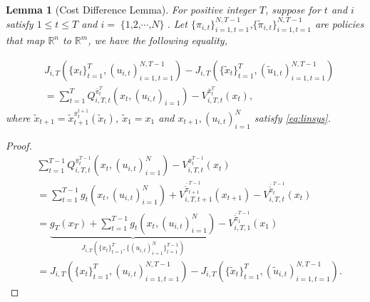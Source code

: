\documentclass[letterpaper, 10 pt, conference]{ieeeconf}  %
\DeclareMathOperator{\Nplayers}{\{1,2,\cdots,\textit{N}\}}
\newtheorem{lemma}{Lemma}
\begin{document}
\begin{lemma}[Cost Difference Lemma]\label{lemma:costDifference}
For positive integer $T$, suppose for $t$ and $i$ satisfy $1 \leq t \leq T$ and $i = \Nplayers$. Let 
$\{\pi_{i,t}\}_{i=1,t=1}^{N,T-1}$,$\{\tilde{\pi}_{i,t}\}_{i=1,t=1}^{N,T-1}$ are policies that map $\mathbb{R}^{n}$ to $\mathbb{R}^{m}$, we have the following equality,

\begin{align*}
    &J_{i,T}(\{x_{t}\}_{t=1}^{T},(u_{i,t})_{i=1,t=1}^{N,T-1}) - J_{i,T}(\{\tilde{x}_{t}\}_{t=1}^{T},(\tilde{u}_{1,t})_{i=1,t=1}^{N,T-1})\\
    &= \sum_{t=1}^{T} Q_{i,T,t}^{\bar{\pi}_{t}^{T}}(x_{t},(u_{i,t})_{i=1}) -  V_{i,T,t}^{\bar{\pi}_{t}^{T}}(x_{t}),
\end{align*}
where $\tilde{x}_{t+1} = \tilde{x}_{t+1}^{\bar{\pi}_{t}^{t+1}}(\tilde{x}_{t})$, $\tilde{x}_{1} = x_{1}$ and $x_{t+1},(u_{i,t})_{i=1}^{N}$ satisfy \eqref{eq:linsys}.
\end{lemma}

\begin{proof}
\begin{align*}
    &\sum_{t=1}^{T-1} Q_{i,T,t}^{\bar{\pi}_{t}^{T-1}}(x_{t},(u_{i,t})_{i=1}^{N}) -  V_{i,T,t}^{\bar{\pi}_{t}^{T-1}}(x_{t}) \\
    &= \sum_{t=1}^{T-1} g_{t}(x_{t},(u_{i,t})_{i=1}^{N})+ V_{i,T,t+1}^{\bar{\tilde{\pi}}_{t+1}^{T-1}}(x_{t+1})-V_{i,T,t}^{\bar{\tilde{\pi}}_{t}^{T-1}}(x_{t})\\
    &= \underbrace{g_{T}(x_{T}) + \sum_{t=1}^{T-1} g_{t}(x_{t},(u_{i,t})_{i=1}^{N})}_{J_{i,T}(\{x_{t}\}_{t=1}^{T},\{(u_{i,t})_{i=1}^{N}\}_{t=1}^{T-1})} - V_{i,T,1}^{\bar{\tilde{\pi}}_{1}^{T-1}}(x_{1})\\
    &= J_{i,T}(\{x_{t}\}_{t=1}^{T},(u_{i,t})_{i=1,t=1}^{N,T-1}) - J_{i,T}(\{\tilde{x}_{t}\}_{t=1}^{T},(\tilde{u}_{i,t})_{i=1,t=1}^{N,T-1}).
\end{align*}
\end{proof}
\end{document}
